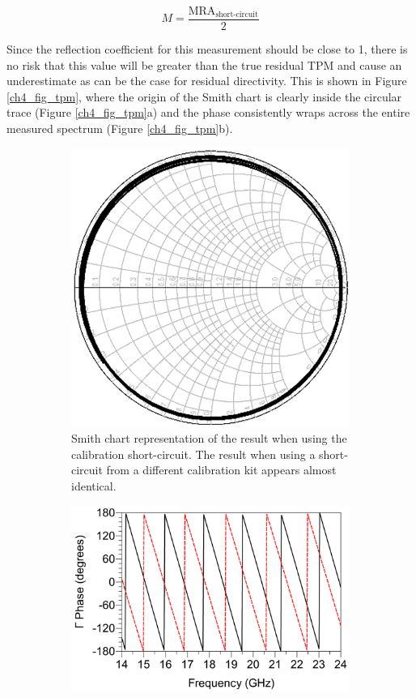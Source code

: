 \documentclass[../thesis/thesis.tex]{subfiles}
\begin{document}
\begin{refsection}
\begin{equation}
M = \frac{\textrm{MRA}_\textrm{short-circuit}}{2}
\end{equation}

Since the reflection coefficient for this measurement should be close to 1, there is no risk that this value will be greater than the true residual TPM and cause an underestimate as can be the case for residual directivity. This is shown in Figure \ref{ch4_fig_tpm}, where the origin of the Smith chart is clearly inside the circular trace (Figure \ref{ch4_fig_tpm}a) and the phase consistently wraps across the entire measured spectrum (Figure \ref{ch4_fig_tpm}b).

\begin{figure}
	\centering
	\begin{subfigure}{0.37\textwidth}
		\centering
		\includegraphics[width=0.9\linewidth]{tpm-a.png}
		\caption{Smith chart representation of the result when using the calibration short-circuit. The result when using a short-circuit from a different calibration kit appears almost identical.}
	\end{subfigure}\hfill%
	\begin{subfigure}{0.6\textwidth}
		\centering
		\includegraphics[width=0.9\linewidth]{tpm-b.png}

\end{subfigure}
\end{figure}
\end{refsection}
\end{document}
